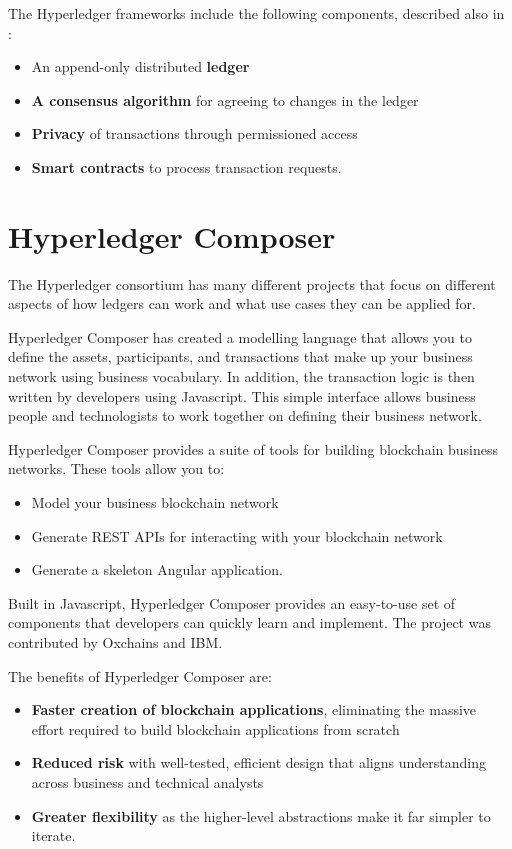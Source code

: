 The Hyperledger frameworks include the following components, described also in :
	\begin{itemize}
	\item An append-only distributed \textbf{ledger}
	\item \textbf{A consensus algorithm} for agreeing to changes in the ledger
	\item \textbf{Privacy} of transactions through permissioned access
	\item \textbf{Smart contracts} to process transaction requests.
	\end{itemize}


\section{Hyperledger Composer}
\label{sub-sec:chapter1-section2}
The Hyperledger consortium has many different projects that focus on different aspects of how ledgers can work and what use cases they can be applied for.

Hyperledger Composer has created a modelling language that allows you to define the assets, participants, and transactions that make up your business network using business vocabulary. In addition, the transaction logic is then written by developers using Javascript. This simple interface allows business people and technologists to work together on defining their business network.

Hyperledger Composer provides a suite of tools for building blockchain business networks. These tools allow you to:
\begin{itemize}
	\item Model your business blockchain network
	\item Generate REST APIs for interacting with your blockchain network
	\item Generate a skeleton Angular application.
\end{itemize}

Built in Javascript, Hyperledger Composer provides an easy-to-use set of components that developers can quickly learn and implement. The project was contributed by Oxchains and IBM.

The benefits of Hyperledger Composer are:
\begin{itemize}
	\item \textbf{Faster creation of blockchain applications}, eliminating the massive effort required to build blockchain applications from scratch
	\item \textbf{Reduced risk} with well-tested, efficient design that aligns understanding across business and technical analysts
	\item \textbf{Greater flexibility} as the higher-level abstractions make it far simpler to iterate.
\end{itemize}


